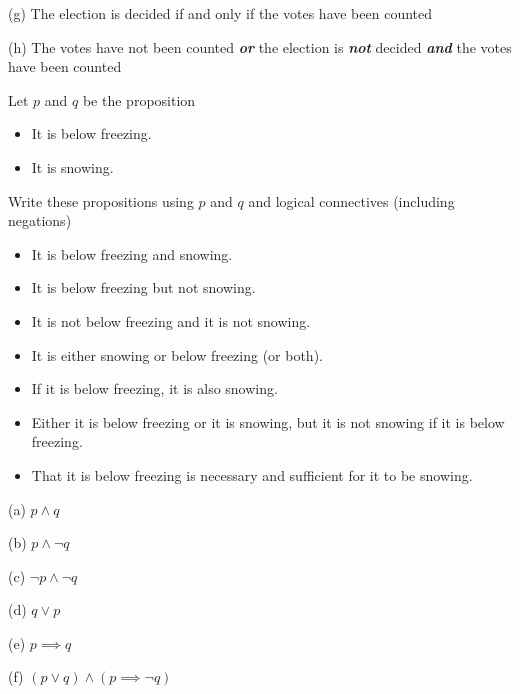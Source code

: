 \documentclass[addpoints]{exam}
\newenvironment{problem}[2][Problem]{\begin{trivlist}
    \item[\hskip \labelsep {\bfseries #1}\hskip \labelsep {\bfseries #2.}]}{\end{trivlist}}
\begin{document}
\begin{sloppypar}
\begin{questions}
\begin{solution}
        (g) The election is decided if and only if the votes have been counted

        (h) The votes have not been counted \textbf{\textit{or}} the election is \textbf{\textit{not}} decided \textbf{\textit{and}} the votes have been counted
    \end{solution}
\end{questions}

\begin{problem}{2}
Let $p$ and $q$ be the proposition
\begin{itemize}
    \item[$p:$] It is below freezing.
    \item[$q:$] It is snowing.
\end{itemize}

Write these propositions using $p$ and $q$ and logical connectives (including negations)

\begin{itemize}
    \item [(a)] It is below freezing and snowing.
    \item [(b)] It is below freezing but not snowing.
    \item [(c)] It is not below freezing and it is not snowing.
    \item [(d)] It is either snowing or below freezing (or both).
    \item [(e)] If it is below freezing, it is also snowing.
    \item [(f)] Either it is below freezing or it is snowing, but it is
          not snowing if it is below freezing.
    \item [(g)] That it is below freezing is necessary and sufficient
          for it to be snowing.
\end{itemize}

\end{problem}

\begin{questions}
    \question
    \begin{solution}
        
        (a) $ p \land q $

        (b) $ p \land \neg q $

        (c) $ \neg p \land \neg q $ 

        (d) $ q \lor p $

        (e) $ p \implies q $

        (f) $ (p \lor q) \land (p \implies \neg q)$


\end{solution}
\end{questions}
\end{sloppypar}
\end{document}
